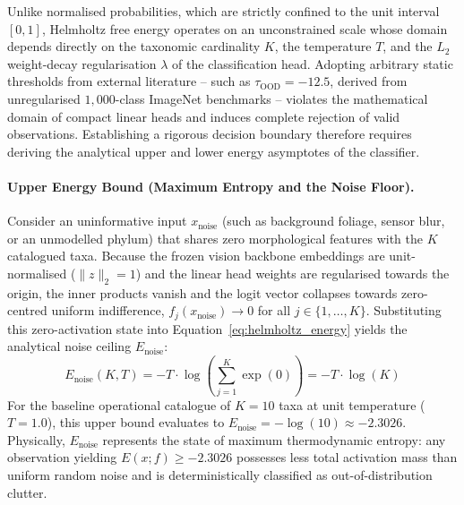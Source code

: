 Unlike normalised probabilities, which are strictly confined to the unit interval $[0, 1]$, Helmholtz free energy operates on an unconstrained scale whose domain depends directly on the taxonomic cardinality $K$, the temperature $T$, and the $L_2$ weight-decay regularisation $\lambda$ of the classification head. Adopting arbitrary static thresholds from external literature -- such as $\tau_{\text{OOD}} = -12.5$, derived from unregularised $1{,}000$-class ImageNet benchmarks -- violates the mathematical domain of compact linear heads and induces complete rejection of valid observations. Establishing a rigorous decision boundary therefore requires deriving the analytical upper and lower energy asymptotes of the classifier.

\paragraph{Upper Energy Bound (Maximum Entropy and the Noise Floor).}
Consider an uninformative input $x_{\text{noise}}$ (such as background foliage, sensor blur, or an unmodelled phylum) that shares zero morphological features with the $K$ catalogued taxa. Because the frozen vision backbone embeddings are unit-normalised ($\|z\|_2 = 1$) and the linear head weights are regularised towards the origin, the inner products vanish and the logit vector collapses towards zero-centred uniform indifference, $f_j(x_{\text{noise}}) \to 0$ for all $j \in \{1, \dots, K\}$. Substituting this zero-activation state into Equation~\ref{eq:helmholtz_energy} yields the analytical noise ceiling $E_{\text{noise}}$:
\begin{equation}
E_{\text{noise}}(K, T) = -T \cdot \log \left( \sum_{j=1}^{K} \exp(0) \right) = -T \cdot \log(K)
\label{eq:energy_upper_bound}
\end{equation}
For the baseline operational catalogue of $K = 10$ taxa at unit temperature ($T = 1.0$), this upper bound evaluates to $E_{\text{noise}} = -\log(10) \approx -2.3026$. Physically, $E_{\text{noise}}$ represents the state of maximum thermodynamic entropy: any observation yielding $E(x; f) \ge -2.3026$ possesses less total activation mass than uniform random noise and is deterministically classified as out-of-distribution clutter.


